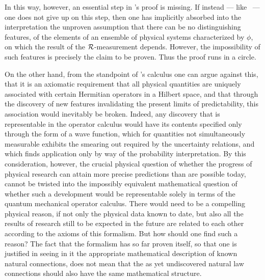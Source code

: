 {{\narrower 


In this way, however, an essential step in \vN's  proof is missing.       If instead --- like \vN\ --- one does not give up on this step,  then one has implicitly absorbed into the interpretation the unproven assumption that there can be no distinguishing features, of the elements of an ensemble of physical systems characterized by $\phi$, on which the result of the ${\cal R}$-measurement depends.   However, the impossibility of such features is precisely the claim to be proven.  Thus the proof runs in a circle. 



On the other hand, from the standpoint of \vN's calculus one can argue against this,
that  it is an axiomatic requirement that all physical quantities are uniquely
associated with certain Hermitian operators in a Hilbert space, and that through the discovery
of new features invalidating the present limits of predictability, this association would
inevitably be broken.  Indeed, any discovery that is representable in the operator calculus
would have its contents specified only through the form of a wave function, which for quantities
not simultaneously measurable exhibits the smearing out required by the uncertainty
relations, and which finds application only by way of the probability interpretation.   By this consideration, however, the crucial physical question of whether the progress of physical research can attain more precise predictions than are possible today, cannot be twisted into the impossibly equivalent mathematical question of whether such a development would be representable solely in terms of the quantum mechanical operator calculus.  There would need to be a compelling physical reason, if not only the physical data known to date, but also all the results of research still to be expected in the future are related to each other according to the axioms of this formalism. But how should one find such a reason?
The fact that the formalism has so far proven itself, so that one is justified in seeing in it
the appropriate mathematical description of known natural connections, does not mean that
the as yet undiscovered natural law connections should also have the same mathematical
structure.


}}



